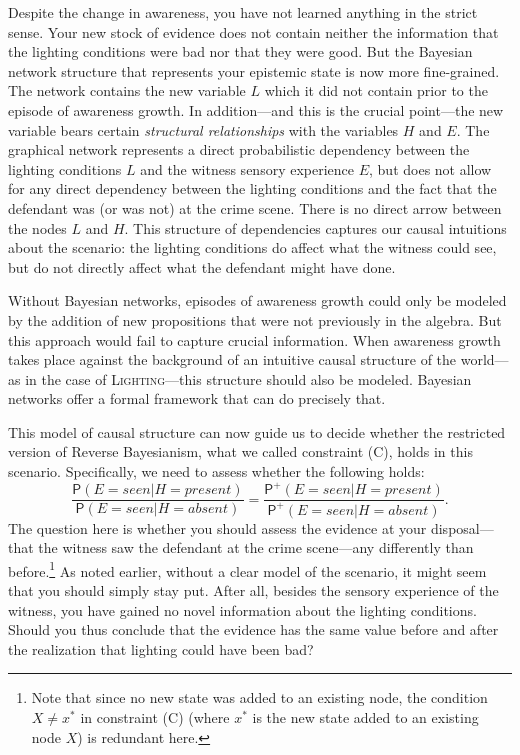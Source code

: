 \documentclass[
  11pt,
  dvipsnames,enabledeprecatedfontcommands]{scrartcl}
\newcommand{\pr}[1]{\ensuremath{\mathsf{P}(#1)}}
\newcommand{\ppr}[2]{\ensuremath{\mathsf{P}^{#1}(#2)}}
\begin{document}
Despite the change in awareness, you have not learned anything in the
strict sense. Your new stock of evidence does not contain neither the
information that the lighting conditions were bad nor that they were
good. But the Bayesian network structure that represents your epistemic
state is now more fine-grained. The network contains the new variable
\(L\) which it did not contain prior to the episode of awareness growth.
In addition---and this is the crucial point---the new variable bears
certain \emph{structural relationships} with the variables \(H\) and
\(E\). The graphical network represents a direct probabilistic
dependency between the lighting conditions \(L\) and the witness sensory
experience \(E\), but does not allow for any direct dependency between
the lighting conditions and the fact that the defendant was (or was not)
at the crime scene. There is no direct arrow between the nodes \(L\) and
\(H\). This structure of dependencies captures our causal intuitions
about the scenario: the lighting conditions do affect what the witness
could see, but do not directly affect what the defendant might have
done.

Without Bayesian networks, episodes of awareness growth could only be
modeled by the addition of new propositions that were not previously in
the algebra. But this approach would fail to capture crucial
information. When awareness growth takes place against the background of
an intuitive causal structure of the world---as in the case of
\textsc{Lighting}---this structure should also be modeled. Bayesian
networks offer a formal framework that can do precisely that.

This model of causal structure can now guide us to decide whether the
restricted version of Reverse Bayesianism, what we called constraint
(C), holds in this scenario. Specifically, we need to assess whether the
following holds:
\[\frac{\pr{E=seen \vert H=present}}{\pr{E=seen \vert H=absent}}= \frac{\ppr{+}{E=seen \vert H=present}}{\ppr{+}{E=seen \vert H=absent}}.\]
The question here is whether you should assess the evidence at your
disposal---that the witness saw the defendant at the crime scene---any
differently than before.\footnote{Note that since no new state was added
  to an existing node, the condition \(X\neq x^*\) in constraint (C)
  (where \(x^*\) is the new state added to an existing node \(X\)) is
  redundant here.} As noted earlier, without a clear model of the
scenario, it might seem that you should simply stay put. After all,
besides the sensory experience of the witness, you have gained no novel
information about the lighting conditions. Should you thus conclude that
the evidence has the same value before and after the realization that
lighting could have been bad?
\end{document}
